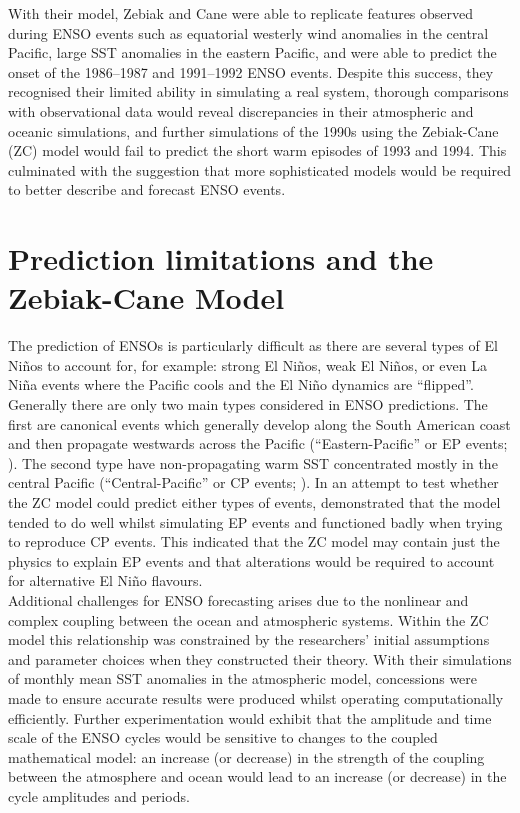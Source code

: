 \documentclass[12pt, onecolumn]{revtex4}    %
\begin{document}
With their model, Zebiak and Cane were able to replicate features observed during ENSO events such as equatorial westerly wind anomalies in the central Pacific, large SST anomalies in the eastern Pacific, and were able to predict the onset of the 1986--1987 and 1991--1992 ENSO events. Despite this success, they recognised their limited ability in simulating a real system, thorough comparisons with observational data would reveal discrepancies in their atmospheric and oceanic simulations, and further simulations of the 1990s using the Zebiak-Cane (ZC) model would fail to predict the short warm episodes of 1993 and 1994. This culminated with the suggestion that more sophisticated models would be required to better describe and forecast ENSO events.

\section{Prediction limitations and the Zebiak-Cane Model}
\noindent
The prediction of ENSOs is particularly difficult as there are several types of El Ni\~{n}os to account for, for example: strong El Ni\~{n}os, weak El Ni\~{n}os, or even La Ni\~{n}a events where the Pacific cools and the El Ni\~{n}o dynamics are ``flipped''. Generally there are only two main types considered in ENSO predictions. The first are canonical events which generally develop along the South American coast and then propagate westwards across the Pacific (``Eastern-Pacific'' or EP events; \citealt{rasmusson1982variations}). The second type have non-propagating warm SST concentrated mostly in the central Pacific (``Central-Pacific'' or CP events; \citealt{ashok2007nino}). In an attempt to test whether the ZC model could predict either types of events, \cite{duan2013behaviors} demonstrated that the model tended to do well whilst simulating EP events and functioned badly when trying to reproduce CP events. This indicated that the ZC model may contain just the physics to explain EP events and that alterations would be required to account for alternative El Ni\~{n}o flavours. \\

Additional challenges for ENSO forecasting arises due to the nonlinear and complex coupling between the ocean and atmospheric systems. Within the ZC model this relationship was constrained by the researchers' initial assumptions and parameter choices when they constructed their theory. With their simulations of monthly mean SST anomalies in the atmospheric model, concessions were made to ensure accurate results were produced whilst operating computationally efficiently. Further experimentation would exhibit that the amplitude and time scale of the ENSO cycles would be sensitive to changes to the coupled mathematical model: an increase (or decrease) in the strength of the coupling between the atmosphere and ocean would lead to an increase (or decrease) in the cycle amplitudes and periods. \\
\end{document}
